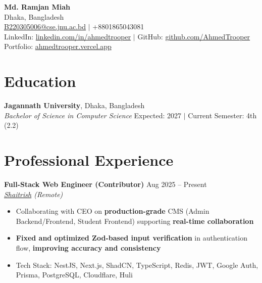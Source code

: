 \documentclass[10pt,a4paper]{article}
\begin{document}
\begin{center}
    {\LARGE \textbf{Md. Ramjan Miah}} \\[3pt]
    Dhaka, Bangladesh \\[2pt]
    \href{mailto:B220305006@cse.jnu.ac.bd}{B220305006@cse.jnu.ac.bd} $|$ +8801865043081 \\[2pt]
    LinkedIn: \href{https://linkedin.com/in/ahmedtrooper}{linkedin.com/in/ahmedtrooper} $|$ 
    GitHub: \href{https://github.com/AhmedTrooper}{github.com/AhmedTrooper} \\[2pt]
    Portfolio: \href{https://ahmedtrooper.vercel.app}{ahmedtrooper.vercel.app}
\end{center}

\vspace{-4pt}

\section{Education}
\textbf{Jagannath University}, Dhaka, Bangladesh \\
\textit{Bachelor of Science in Computer Science} \hfill Expected: 2027 $|$ Current Semester: 4th (2.2)

\section{Professional Experience}
\textbf{Full-Stack Web Engineer (Contributor)} \hfill Aug 2025 -- Present \\
\textit{\href{https://www.shaitrish.com/}{Shaitrish} (Remote)} \\[-6pt]
\begin{itemize}[leftmargin=12pt, itemsep=0pt, topsep=2pt]
    \item Collaborating with CEO on \textbf{production-grade} CMS (Admin Backend/Frontend, Student Frontend) supporting \textbf{real-time collaboration}
    \item \textbf{Fixed and optimized Zod-based input verification} in authentication flow, \textbf{improving accuracy and consistency}
    \item Tech Stack: NestJS, Next.js, ShadCN, TypeScript, Redis, JWT, Google Auth, Prisma, PostgreSQL, Cloudflare, Huli
\end{itemize}

\end{document}
